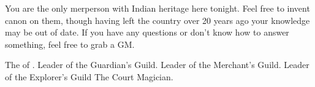 \documentclass[char]{NeptuneBall}
\begin{document}
\begin{itemz}[Notes]
  \item You are the only merperson with Indian heritage here tonight. Feel free to invent canon on them, though having left the country over 20 years ago your knowledge may be out of date. If you have any questions or don't know how to answer something, feel free to grab a GM.
\end{itemz}


\begin{contacts}
  \contact{\cKing{}} The \cKing{\King} of \pAtlantis{}.
  \contact{\cGeneral{}} Leader of the Guardian's Guild.
  \contact{\cSlave{}} Leader of the Merchant's Guild.
  \contact{\cPriest{}} Leader of the Explorer's Guild
  \contact{\cManta{}} The Court Magician.
\end{contacts}
\end{document}
